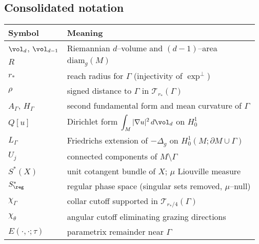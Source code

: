 \subsection{Consolidated notation}
\begin{center}
\renewcommand{\arraystretch}{1.12}
\begin{tabular}{|l|l|}
\hline
Symbol & Meaning \\
\hline
$\vol_d$, $\vol_{d-1}$ & Riemannian $d$–volume and $(d-1)$–area \\
$R$ & $\mathrm{diam}_g(M)$ \\
$r_*$ & reach radius for $\Gamma$ (injectivity of $\exp^\perp$) \\
$\rho$ & signed distance to $\Gamma$ in $\mathcal T_{r_*}(\Gamma)$ \\
$A_\Gamma$, $H_\Gamma$ & second fundamental form and mean curvature of $\Gamma$ \\
$Q[u]$ & Dirichlet form $\displaystyle\int_M |\nabla u|^2\,d\vol_d$ on $H^1_0$ \\
$L_\Gamma$ & Friedrichs extension of $-\Delta_g$ on $H^1_0(M;\partial M\cup\Gamma)$ \\
$U_j$ & connected components of $M\setminus\Gamma$ \\
$S^*(X)$ & unit cotangent bundle of $X$; $\mu$ Liouville measure \\
$S^*_{\reg}$ & regular phase space (singular sets removed, $\mu$–null) \\
$\chi_\Gamma$ & collar cutoff supported in $\mathcal T_{r_*/4}(\Gamma)$ \\
$\chi_\theta$ & angular cutoff eliminating grazing directions \\
$E(\cdot,\cdot;\tau)$ & parametrix remainder near $\Gamma$ \\
\hline
\end{tabular}
\end{center}

